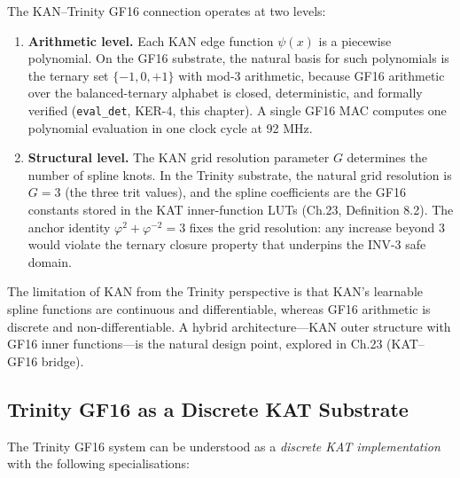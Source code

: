 The KAN--Trinity GF16 connection operates at two
levels:

\begin{enumerate}
\item \textbf{Arithmetic level.} Each KAN edge
function \(\psi(x)\) is a piecewise polynomial. On
the GF16 substrate, the natural basis for such
polynomials is the ternary set
\(\{-1, 0, +1\}\) with mod-3 arithmetic, because
GF16 arithmetic over the balanced-ternary alphabet
is closed, deterministic, and formally verified
(\texttt{eval\_det}, KER-4, this chapter). A
single GF16 MAC computes one polynomial evaluation
in one clock cycle at 92 MHz.

\item \textbf{Structural level.} The KAN grid
resolution parameter \(G\) determines the number
of spline knots. In the Trinity substrate, the
natural grid resolution is \(G = 3\) (the three
trit values), and the spline coefficients are the
GF16 constants stored in the KAT inner-function
LUTs (Ch.23, Definition 8.2). The anchor identity
\(\varphi^2 + \varphi^{-2} = 3\) fixes the grid
resolution: any increase beyond \(3\) would
violate the ternary closure property that
underpins the INV-3 safe domain.
\end{enumerate}

The limitation of KAN from the Trinity perspective
is that KAN's learnable spline functions are
continuous and differentiable, whereas GF16
arithmetic is discrete and non-differentiable. A
hybrid architecture---KAN outer structure with
GF16 inner functions---is the natural design
point, explored in Ch.23 (KAT--GF16 bridge).

\subsection{Trinity GF16 as a Discrete KAT
Substrate}\label{fa_27:trinity-gf16-discrete-kat}

The Trinity GF16 system can be understood as a
\emph{discrete KAT implementation} with the
following specialisations:

